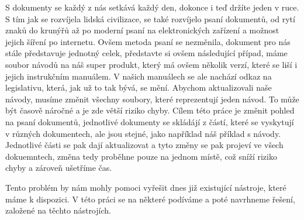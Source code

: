 S dokumenty se každý z nás setkává každý den, dokonce i teď držíte jeden v ruce. S tím jak se rozvíjela lidská civilizace,
se také rozvíjelo psaní dokumentů, od rytí znaků do krunýřů až po moderní psaní na elektronických zařízení a možnost jejich šíření po internetu.
Ovšem metoda psaní se nezměnila, dokument pro nás stále představuje jednotný celek, představte si ovšem následující případ, máme soubor návodů na náš super
produkt, který má ovšem několik verzí, které se liší i jejich instrukčním manuálem. V našich manuálech se ale nachází odkaz na legislativu, která, jak už to tak
bývá, se mění. Abychom aktualizovali naše návody, musíme změnit všechny soubory, které reprezentují jeden návod. To může být časově náročné a je zde větší riziko
chyby. Cílem této práce je změnit pohled na psaní dokumentů, jednotlivé dokumenty se skládájí z částí, které se vyskytují v různých dokumentech, ale jsou stejné,
jako například náš příklad s návody. Jednotlivé části se pak dají aktualizovat a tyto změny se pak projeví ve všech dokuemntech, změna tedy proběhne
pouze na jednom místě, což sníží riziko chyby a zároveň ušetříme čas.

Tento problém by nám mohly pomoci vyřešit dnes již existující nástroje, které máme k dispozici. V této práci se na některé podíváme a poté navrhneme řešení, založené
na těchto nástrojích.